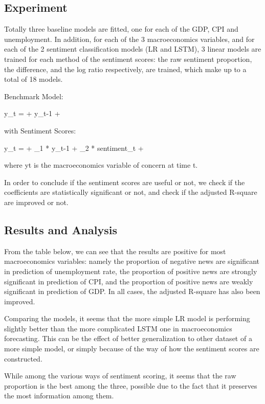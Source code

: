 \documentclass[11pt,a4paper]{article}
\begin{document}
\subsection{Experiment}

Totally three baseline models are fitted, one for each of the GDP, CPI and unemployment. In addition, for each of the 3 macroeconomics variables, and for each of the 2 sentiment classification models (LR and LSTM), 3 linear models are trained for each method of the sentiment scores: the raw sentiment proportion, the difference, and the log ratio respectively, are trained, which make up to a total of 18 models.

Benchmark Model:

y_t = \alpha + \beta * y_{t-1} + \epsilon

with Sentiment Scores:

y_t = \alpha + \beta_1 * y_{t-1} + \beta_2 * sentiment_t + \epsilon

where yt is the macroeconomics variable of concern at time t.

In order to conclude if the sentiment scores are useful or not, we check if the coefficients are statistically significant or not, and  check if the adjusted R-square are improved or not.


\subsection{Results and Analysis}

From the table below, we can see that the results are positive for most macroeconomics variables: namely the proportion of negative news are significant in prediction of unemployment rate, the proportion of positive news are strongly significant in prediction of CPI, and the proportion of positive news are weakly significant in prediction of GDP. In all cases, the adjusted R-square has also been improved.

Comparing the models, it seems that the more simple LR model is performing slightly better than the more complicated LSTM one in macroeconomics forecasting. This can be the effect of better generalization to other dataset of a more simple model, or simply because of the way of how the sentiment scores are constructed.

While among the various ways of sentiment scoring, it seems that the raw proportion is the best among the three, possible due to the fact that it preserves the most information among them.
\end{document}
